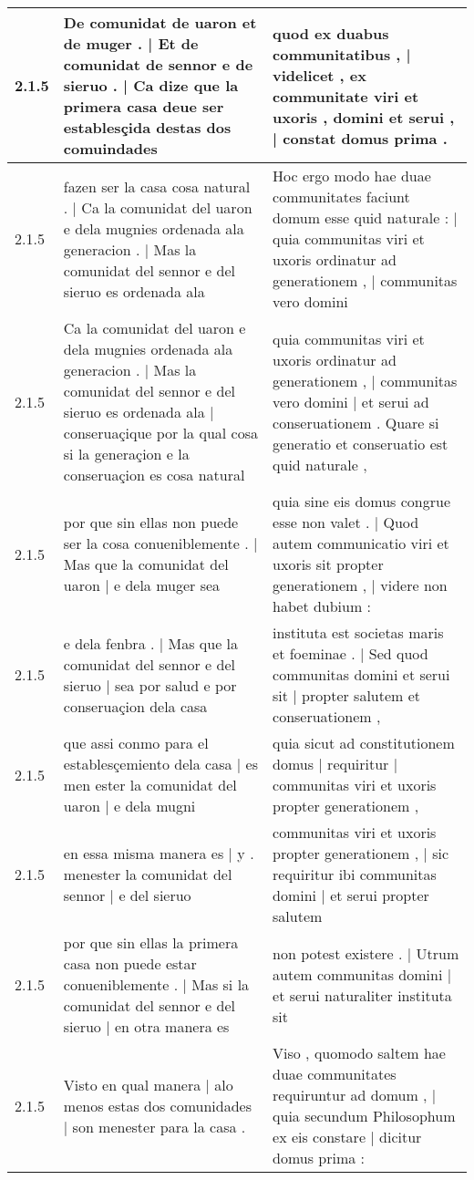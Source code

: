 \begin{tabular}{|p{1cm}|p{6.5cm}|p{6.5cm}|}
2.1.5 & De comunidat de uaron et de muger . | Et de comunidat de sennor e de sieruo . | Ca dize que la primera casa deue ser establesçida destas dos comuindades & quod ex duabus communitatibus , | videlicet , ex communitate viri et uxoris , domini et serui , | constat domus prima . \\\hline
2.1.5 & fazen ser la casa cosa natural . | Ca la comunidat del uaron e dela mugnies ordenada ala generacion . | Mas la comunidat del sennor e del sieruo es ordenada ala & Hoc ergo modo hae duae communitates faciunt domum esse quid naturale : | quia communitas viri et uxoris ordinatur ad generationem , | communitas vero domini \\\hline
2.1.5 & Ca la comunidat del uaron e dela mugnies ordenada ala generacion . | Mas la comunidat del sennor e del sieruo es ordenada ala | conseruaçique por la qual cosa si la generaçion e la conseruaçion es cosa natural & quia communitas viri et uxoris ordinatur ad generationem , | communitas vero domini | et serui ad conseruationem . Quare si generatio et conseruatio est quid naturale , \\\hline
2.1.5 & por que sin ellas non puede ser la cosa conueniblemente . | Mas que la comunidat del uaron | e dela muger sea & quia sine eis domus congrue esse non valet . | Quod autem communicatio viri et uxoris sit propter generationem , | videre non habet dubium : \\\hline
2.1.5 & e dela fenbra . | Mas que la comunidat del sennor e del sieruo | sea por salud e por conseruaçion dela casa & instituta est societas maris et foeminae . | Sed quod communitas domini et serui sit | propter salutem et conseruationem , \\\hline
2.1.5 & que assi conmo para el establesçemiento dela casa | es men ester la comunidat del uaron | e dela mugni & quia sicut ad constitutionem domus | requiritur | communitas viri et uxoris propter generationem , \\\hline
2.1.5 & en essa misma manera es | y . menester la comunidat del sennor | e del sieruo & communitas viri et uxoris propter generationem , | sic requiritur ibi communitas domini | et serui propter salutem \\\hline
2.1.5 & por que sin ellas la primera casa non puede estar conueniblemente . | Mas si la comunidat del sennor e del sieruo | en otra manera es & non potest existere . | Utrum autem communitas domini | et serui naturaliter instituta sit \\\hline
2.1.5 & Visto en qual manera | alo menos estas dos comunidades | son menester para la casa . & Viso , quomodo saltem hae duae communitates requiruntur ad domum , | quia secundum Philosophum ex eis constare | dicitur domus prima : \\\hline

\end{tabular}

